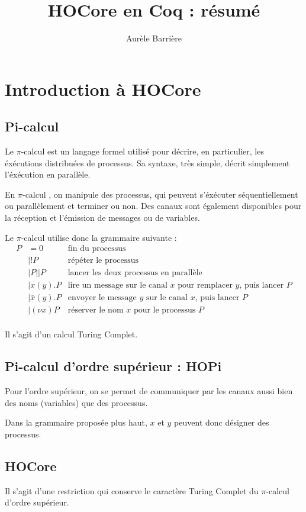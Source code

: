 \documentclass{article}
\title{HOCore en Coq : résumé}
\author{Aurèle Barrière}
\def\pic{$\pi$-calcul }
\begin{document}
\maketitle
\tableofcontents

\section{Introduction à HOCore}
\subsection{Pi-calcul}
Le \pic est un langage formel utilisé pour décrire, en particulier, les éxécutions distribuées de processus. Sa syntaxe, très simple, décrit simplement l'éxécution en parallèle.

En \pic, on manipule des processus, qui peuvent s'éxécuter séquentiellement ou parallèlement et terminer ou non. Des canaux sont également disponibles pour la réception et l'émission de messages ou de variables.

Le \pic utilise donc la grammaire suivante :
\begin{align*}
P &= 0 & \text{fin du processus} \\
&| !P &\text{répéter le processus}\\
&| P||P &\text{lancer les deux processus en parallèle}\\
&| x(y).P &\text{lire un message sur le canal $x$ pour remplacer $y$, puis lancer $P$}\\
&| \bar{x}(y).P &\text{envoyer le message $y$ sur le canal $x$, puis lancer $P$}\\
&| (\nu x)P &\text{réserver le nom $x$ pour le processus $P$}\\
\end{align*}

Il s'agit d'un calcul Turing Complet.

\subsection{Pi-calcul d'ordre supérieur : HOPi}
Pour l'ordre supérieur, on se permet de communiquer par les canaux aussi bien des noms (variables) que des processus.

Dans la grammaire proposée plus haut, $x$ et $y$ peuvent donc désigner des processus.

\subsection{HOCore}
Il s'agit d'une restriction qui conserve le caractère Turing Complet du \pic d'ordre supérieur. 
\end{document}
